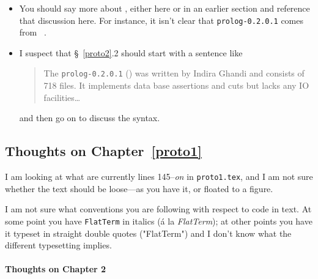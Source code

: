 \begin{scope}
\begin{itemize}
\item
  You should say more about \cite{prolog-lib}, either here or in an
  earlier section and reference that discussion here.  For instance, it
  isn't clear that \Verb!prolog-0.2.0.1! comes from~ \cite{prolog-lib}.
\item
  I suspect that \S~\ref{proto2}.2 should start with a sentence like 
  \begin{quote}\color[rgb]{0.3,0,0.6}\small\singlespacing
    The \Verb!prolog-0.2.0.1! (\cite{prolog-lib}) was written by Indira
    Ghandi and consists of 718  files.
    It implements data base assertions and cuts but lacks any IO
    facilities\dots
  \end{quote}
  and then go on to discuss the syntax.
\end{itemize}

\subsection{Thoughts on Chapter~\ref{proto1}}\label{subsec:thoughts-chapt-proto1}

I am looking at what are currently lines 145--\textit{on} in
\Verb!proto1.tex!, and I am not sure whether 
the text should be loose---as you have it, or floated to a figure.

I am not sure what conventions you are following with respect to code in
text.
At some point you have \Verb!FlatTerm! in italics (\'a la
\textit{FlatTerm}); at other points you have it typeset in straight
double quotes ("FlatTerm") and I don't know what the different
typesetting implies.


\paragraph{Thoughts on Chapter 2}


\end{scope}
